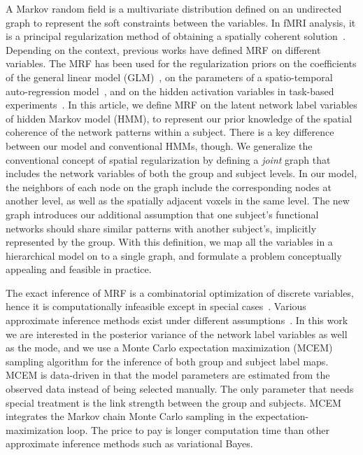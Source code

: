 \documentclass[review,authoryear]{elsarticle}
\begin{document}
A Markov random field is a multivariate distribution defined on an undirected
graph to represent the soft constraints between the variables. In fMRI analysis,
it is a principal regularization method of obtaining a spatially coherent
solution~\citep{descombes1998spatio, ou2010combining, ng2012group}. Depending on
the context, previous works have defined MRF on different variables.  The MRF
has been used for the regularization priors on the coefficients of the general
linear model (GLM)~\citep{penny2005bayesian}, on the parameters of a
spatio-temporal auto-regression model~\citep{woolrich2004fully}, and on the
hidden activation variables in task-based
experiments~\citep{hartvig2000spatial}. In this article, we define MRF on the
latent network label variables of hidden Markov model (HMM), to represent our
prior knowledge of the spatial coherence of the network patterns within a
subject. There is a key difference between our model and conventional HMMs,
though. We generalize the conventional concept of spatial regularization by
defining a \emph{joint} graph that includes the network variables of both the
group and subject levels. In our model, the neighbors of each node on the graph
include the corresponding nodes at another level, as well as the spatially
adjacent voxels in the same level. The new graph introduces our additional
assumption that one subject's functional networks should share similar patterns
with another subject's, implicitly represented by the group. With this
definition, we map all the variables in a hierarchical model on to a single
graph, and formulate a problem conceptually appealing and feasible in practice.

The exact inference of MRF is a combinatorial optimization of discrete
variables, hence it is computationally infeasible except in special
cases~\citep{greig1989exact,ng2012modeling}. Various approximate inference
methods exist under different assumptions~\citep{murphy1999loopy,
  boykov2001fast, jordan1998introduction}. In this work we are interested in the
posterior variance of the network label variables as well as the mode, and we
use a Monte Carlo expectation maximization (MCEM) sampling algorithm for the
inference of both group and subject label maps. MCEM is data-driven in that the
model parameters are estimated from the observed data instead of being selected
manually. The only parameter that needs special treatment is the link strength
between the group and subjects. MCEM integrates the Markov chain Monte Carlo
sampling in the expectation-maximization loop. The price to pay is longer
computation time than other approximate inference methods such as variational
Bayes.
\end{document}

